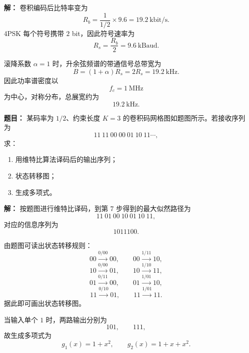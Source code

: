 \par\textbf{解：}
卷积编码后比特率变为
\[
R_b=\frac{1}{1/2}\times 9.6=19.2\ \text{kbit/s}.
\]
4PSK 每个符号携带 $2$ bit，因此符号速率为
\[
R_s=\frac{R_b}{2}=9.6\ \text{kBaud}.
\]

滚降系数 $\alpha=1$ 时，升余弦频谱的带通信号总带宽为
\[
B=(1+\alpha)R_s=2R_s=19.2\ \text{kHz}.
\]
因此功率谱密度以
\[
f_c=1\ \text{MHz}
\]
为中心，对称分布，总展宽约为
\[
19.2\ \text{kHz}.
\]

\medskip
{}
\textbf{题目：}
某码率为 $1/2$、约束长度 $K=3$ 的卷积码网格图如题图所示。若接收序列为
\[
11\ 11\ 00\ 00\ 01\ 10\ 11\cdots,
\]
求：
\begin{enumerate}
\item 用维特比算法译码后的输出序列；
\item 状态转移图；
\item 生成多项式。
\end{enumerate}

\par\textbf{解：}
按题图进行维特比译码，到第 7 步得到的最大似然路径为
\[
11\ 01\ 00\ 10\ 01\ 10\ 11,
\]
对应的信息序列为
\[
1011100.
\]

由题图可读出状态转移规则：
\[
00\xrightarrow{0/00}00,\qquad 00\xrightarrow{1/11}10,
\]
\[
10\xrightarrow{0/00}01,\qquad 10\xrightarrow{1/10}11,
\]
\[
01\xrightarrow{0/11}00,\qquad 01\xrightarrow{1/01}10,
\]
\[
11\xrightarrow{0/10}01,\qquad 11\xrightarrow{1/01}11.
\]
据此即可画出状态转移图。

当输入单个 $1$ 时，两路输出分别为
\[
101,\qquad 111,
\]
故生成多项式为
\[
g_1(x)=1+x^2,\qquad g_2(x)=1+x+x^2.
\]

\medskip
